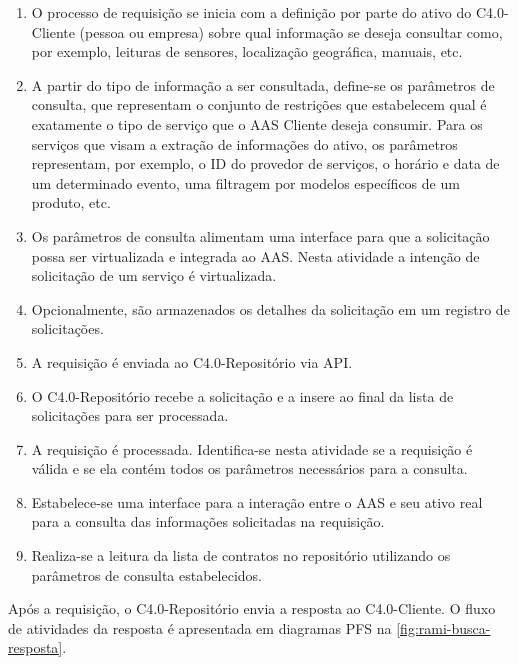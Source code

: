 \begin{enumerate}

	\item O processo de requisição se inicia com a definição por parte do ativo do C4.0-Cliente (pessoa ou empresa) sobre qual informação se deseja consultar como, por exemplo, leituras de sensores, localização geográfica, manuais, etc.

	\item A partir do tipo de informação a ser consultada, define-se os parâmetros de consulta, que representam o conjunto de restrições que estabelecem qual é exatamente o tipo de serviço que o AAS Cliente deseja consumir. Para os serviços que visam a extração de informações do ativo, os parâmetros representam, por exemplo, o ID do provedor de serviços, o horário e data de um determinado evento, uma filtragem por modelos específicos de um produto, etc.

	\item Os parâmetros de consulta alimentam uma interface para que a solicitação possa ser virtualizada e integrada ao AAS. Nesta atividade a intenção de solicitação de um serviço é virtualizada.

	\item Opcionalmente, são armazenados os detalhes da solicitação em um registro de solicitações.

	\item A requisição é enviada ao C4.0-Repositório via API.

	\item O C4.0-Repositório recebe a solicitação e a insere ao final da lista de solicitações para ser processada.

	\item A requisição é processada. Identifica-se nesta atividade se a requisição é válida e se ela contém todos os parâmetros necessários para a consulta.

	\item Estabelece-se uma interface para a interação entre o AAS e seu ativo real para a consulta das informações solicitadas na requisição.

	\item Realiza-se a leitura da lista de contratos no repositório utilizando os parâmetros de consulta estabelecidos.

\end{enumerate}

Após a requisição, o C4.0-Repositório envia a resposta ao C4.0-Cliente. O fluxo de atividades da resposta é apresentada em diagramas PFS na \autoref{fig:rami-busca-resposta}.

